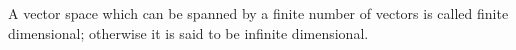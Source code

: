 A vector space which can be spanned by a finite number of vectors is called finite dimensional; otherwise it is said to be infinite dimensional.
